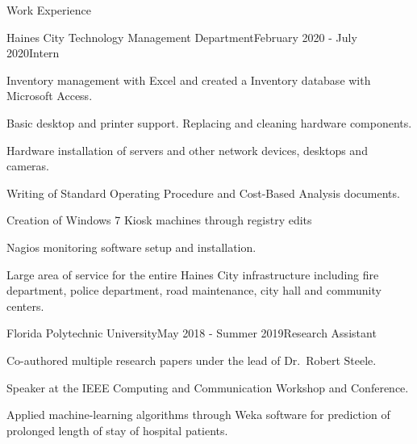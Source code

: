 \documentclass{resume} %
\begin{document}
\begin{rSection}{Work Experience}

\begin{rSubsection}{Haines City Technology Management Department}{February 2020 - July 2020}{Intern}{}
	\item
	Inventory management with Excel and created a Inventory database with Microsoft Access.
	\item
	Basic desktop and printer support. Replacing and cleaning hardware components.
	\item
	Hardware installation of servers and other network devices, desktops and cameras.
	\item
	Writing of Standard Operating Procedure and Cost-Based Analysis documents.
	\item
	Creation of Windows 7 Kiosk machines through registry edits
	\item
	Nagios monitoring software setup and installation.
	\item
	Large area of service for the entire Haines City infrastructure including fire department,
	police department, road maintenance, city hall and community centers.
\end{rSubsection}
\newpage
\begin{rSubsection}{Florida Polytechnic University}{May 2018 - Summer 2019}{Research Assistant}{}
	\item
	Co-authored multiple research papers under the lead of Dr.\ Robert Steele.
	\item
	Speaker at the IEEE Computing and Communication Workshop and Conference.
	\item
	Applied machine-learning algorithms through Weka software for prediction of prolonged
	length of stay of hospital patients.
\end{rSubsection}

\end{rSection}



\end{document}
